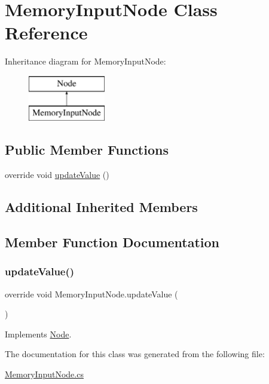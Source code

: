 \hypertarget{class_memory_input_node}{}\section{Memory\+Input\+Node Class Reference}
\label{class_memory_input_node}
Inheritance diagram for Memory\+Input\+Node\+:\begin{figure}[H]
\begin{center}
\leavevmode
\includegraphics[height=2.000000cm]{class_memory_input_node}
\end{center}
\end{figure}
\subsection*{Public Member Functions}
\begin{DoxyCompactItemize}
\item 
override void \mbox{\hyperlink{class_memory_input_node_aa1efec4e8bc221a879c959ba9941587b}{update\+Value}} ()
\end{DoxyCompactItemize}
\subsection*{Additional Inherited Members}


\subsection{Member Function Documentation}
\mbox{\label{class_memory_input_node_aa1efec4e8bc221a879c959ba9941587b}} 
\subsubsection{\texorpdfstring{update\+Value()}{updateValue()}}
{\footnotesize\ttfamily override void Memory\+Input\+Node.\+update\+Value (\begin{DoxyParamCaption}{ }\end{DoxyParamCaption})\hspace{0.3cm}{\ttfamily [virtual]}}







Implements \mbox{\hyperlink{class_node_a85ebd0e36c25430570b94f923afd2a62}{Node}}.



The documentation for this class was generated from the following file\+:\begin{DoxyCompactItemize}
\item 
\mbox{\hyperlink{_memory_input_node_8cs}{Memory\+Input\+Node.\+cs}}\end{DoxyCompactItemize}
